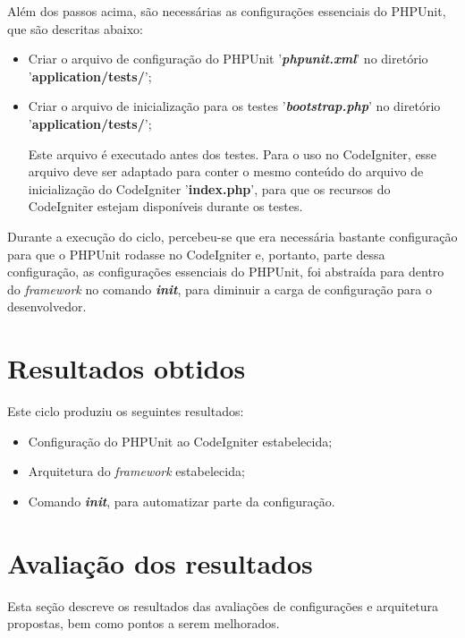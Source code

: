 	  Além dos passos acima, são necessárias as configurações essenciais do PHPUnit, que são descritas abaixo:
	  
	  \begin{itemize}
	    \item Criar o arquivo de configuração do PHPUnit '\textbf{\textit{phpunit.xml}}' 
		  no diretório '\textbf{application/tests/}';
	    
	    \item Criar o arquivo de inicialização para os testes '\textbf{\textit{bootstrap.php}}'
		  no diretório '\textbf{application/tests/}';
	      
		\subitem Este arquivo é executado antes dos testes. Para o uso no CodeIgniter, esse arquivo deve ser
			 adaptado para conter o mesmo conteúdo do arquivo de inicialização do CodeIgniter '\textbf{index.php}', 
			 para que os recursos do CodeIgniter estejam disponíveis durante os testes.
	  \end{itemize}
	  
	  Durante a execução do ciclo, percebeu-se que era necessária bastante configuração para que o PHPUnit rodasse no
	  CodeIgniter e, portanto, parte dessa configuração, as configurações essenciais do PHPUnit, foi abstraída para
	  dentro do \textit{framework} no comando \textit{\textbf{init}}, para diminuir a carga de configuração
	  para o desenvolvedor.
  
  \section{Resultados obtidos}
    
      Este ciclo produziu os seguintes resultados:
      
      \begin{itemize}

	\item Configuração do PHPUnit ao CodeIgniter estabelecida;
	
	\item Arquitetura do \textit{framework} estabelecida;
	
	\item Comando \textit{\textbf{init}}, para automatizar parte da configuração.

      \end{itemize}

  \section{Avaliação dos resultados}
      Esta seção descreve os resultados das avaliações de configurações e arquitetura propostas, bem como pontos a serem melhorados.

